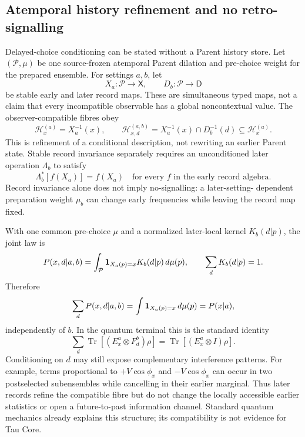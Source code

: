 \documentclass[11pt]{article}
\newcommand{\Tr}{\operatorname{Tr}}
\begin{document}
\subsection{Atemporal history refinement and no retro-signalling}

Delayed-choice conditioning can be stated without a Parent history store.
Let $(\mathcal P,\mu)$ be one source-frozen atemporal Parent dilation and
pre-choice weight for the prepared ensemble.  For settings $a,b$, let
\begin{equation}
 X_a:\mathcal P\to\mathsf X,
 \qquad D_b:\mathcal P\to\mathsf D
 \label{eq:simultaneous-record-maps}
\end{equation}
be stable early and later record maps.  These are simultaneous typed maps,
not a claim that every incompatible observable has a global noncontextual
value.  The observer-compatible fibres obey
\begin{equation}
 \mathcal H_x^{(a)}=X_a^{-1}(x),
 \qquad
 \mathcal H_{x,d}^{(a,b)}
 =X_a^{-1}(x)\cap D_b^{-1}(d)
 \subseteq\mathcal H_x^{(a)}.
 \label{eq:history-refinement-fibres}
\end{equation}
This is refinement of a conditional description, not rewriting an earlier
Parent state.  Stable record invariance separately requires an unconditioned
later operation $\Lambda_b$ to satisfy
\begin{equation}
 \Lambda_b^*[f(X_a)]=f(X_a)
 \quad\text{for every }f\text{ in the early record algebra}.
 \label{eq:stable-record-invariance}
\end{equation}
Record invariance alone does not imply no-signalling: a later-setting-
dependent preparation weight $\mu_b$ can change early frequencies while
leaving the record map fixed.

With one common pre-choice $\mu$ and a normalized later-local kernel
$K_b(d|p)$, the joint law is
\begin{equation}
 P(x,d|a,b)=\int_{\mathcal P}
 {\bf1}_{X_a(p)=x}K_b(d|p)\,d\mu(p),
 \qquad \sum_dK_b(d|p)=1.
 \label{eq:parent-joint-record-law}
\end{equation}
Therefore
\begin{equation}
 \sum_dP(x,d|a,b)
 =\int {\bf1}_{X_a(p)=x}\,d\mu(p)
 =P(x|a),
 \label{eq:no-retro-marginal}
\end{equation}
independently of $b$.  In the quantum terminal this is the standard identity
\begin{equation}
 \sum_d\Tr[(E_x^a\otimes F_d^b)\rho]
 =\Tr[(E_x^a\otimes I)\rho].
 \label{eq:quantum-no-retro-marginal}
\end{equation}
Conditioning on $d$ may still expose complementary interference patterns.
For example, terms proportional to $+V\cos\phi_x$ and $-V\cos\phi_x$ can
occur in two postselected subensembles while cancelling in their earlier
marginal.  Thus later records refine the compatible fibre but do not change
the locally accessible earlier statistics or open a future-to-past
information channel.  Standard quantum mechanics already explains this
structure; its compatibility is not evidence for Tau Core.
\end{document}
